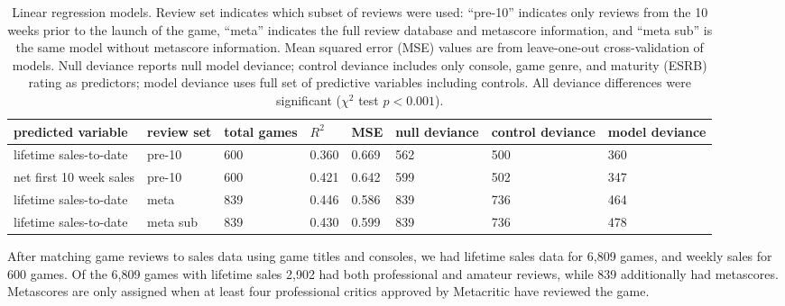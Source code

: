 \documentclass[letterpaper]{article}
\begin{document}
\begin{table}[tb]
\centering
\small
\sffamily
\begin{tabular}{llllllll}
predicted variable & review set & total games & $R^2$ & MSE & null deviance & control deviance & model deviance \\ 
\midrule lifetime sales-to-date & pre-10 & 600 & 0.360 & 0.669 & 562 & 500 & 360\\ 
net first 10 week sales & pre-10 & 600 & 0.421 & 0.642 & 599 & 502 & 347\\ 
lifetime sales-to-date & meta & 839 & 0.446 & 0.586 & 839 & 736 & 464\\ 
lifetime sales-to-date & meta sub & 839 & 0.430 & 0.599 & 839 & 736 & 478\\ 
\end{tabular}
\caption{Linear regression models. Review set indicates which subset of reviews were used:
``pre-10'' indicates only reviews from the 10 weeks prior to the launch of the game,
``meta'' indicates the full review database and metascore information, and ``meta sub'' is the same model without metascore information. 
Mean squared error (MSE) values are from leave-one-out cross-validation of models. Null deviance reports null model deviance; control deviance includes only console, game genre, and maturity (ESRB) rating as predictors; model deviance uses full set of predictive variables including controls. All deviance differences were significant ($\chi^2$ test $p < 0.001$).}
\label{tab:regression_models}
\end{table}

After matching game reviews to sales data using game titles and consoles, we had lifetime sales data for 6,809 games, and weekly sales for 600 games. Of the 6,809 games with lifetime sales 2,902 had both professional and amateur reviews, while 839 additionally had metascores. Metascores are only assigned when at least four professional critics approved by Metacritic have reviewed the game.
\end{document}
